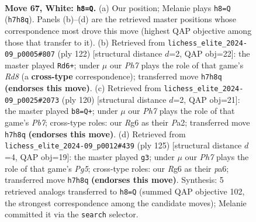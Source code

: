 \documentclass[11pt]{article}
\begin{document}
\clearpage

\begin{figure}[p]\centering
\begin{subfigure}{0.46\textwidth}\centering
\resizebox{\linewidth}{!}{%
\newchessgame
\chessboard[
  setfen={8/7P/6R1/8/8/8/3k1K2/4N3 w - - 1 67},
  showmover=false,
  pgfstyle=straightmove, color=movearrow, markmove={h7-h8}
]}
\caption{}
\end{subfigure}\hfill
\begin{subfigure}{0.46\textwidth}\centering
\resizebox{\linewidth}{!}{%
\newchessgame
\chessboard[
  setfen={3R4/8/5k2/6N1/5K2/8/8/1r6 w - - 27 62},
  showmover=false,
  pgfstyle=straightmove, color=movearrow, markmove={d8-d6}
]}
\caption{}
\end{subfigure}
\\[4pt]
\begin{subfigure}{0.46\textwidth}\centering
\resizebox{\linewidth}{!}{%
\newchessgame
\chessboard[
  setfen={8/1P6/8/8/5k2/5N2/P5K1/8 w - - 1 61},
  showmover=false,
  pgfstyle=straightmove, color=movearrow, markmove={b7-b8}
]}
\caption{}
\end{subfigure}\hfill
\begin{subfigure}{0.46\textwidth}\centering
\resizebox{\linewidth}{!}{%
\newchessgame
\chessboard[
  setfen={8/8/P7/8/4n1p1/4K3/8/5k2 b - - 0 63},
  showmover=false,
  pgfstyle=straightmove, color=movearrow, markmove={g4-g3}
]}
\caption{}
\end{subfigure}
\caption{\textbf{Move 67, White: \texttt{h8=Q}.} (a) Our position; Melanie plays \texttt{h8=Q} (\texttt{h7h8q}). Panels (b)--(d) are the retrieved master positions whose correspondence most drove this move (highest QAP objective among those that transfer to it). (b) Retrieved from \texttt{lichess\_elite\_2024-09\_p0005\#807} (ply 122) [structural distance $d$=2, QAP obj=22]: the master played \texttt{Rd6+}; under $\mu$ our \emph{Ph7} plays the role of that game's \emph{Rd8} (a \textbf{cross-type} correspondence); transferred move \texttt{h7h8q} \textbf{(endorses this move)}. (c) Retrieved from \texttt{lichess\_elite\_2024-09\_p0025\#2073} (ply 120) [structural distance $d$=2, QAP obj=21]: the master played \texttt{b8=Q+}; under $\mu$ our \emph{Ph7} plays the role of that game's \emph{Pb7}; cross-type roles: our \emph{R}g6 as their \emph{P}a2; transferred move \texttt{h7h8q} \textbf{(endorses this move)}. (d) Retrieved from \texttt{lichess\_elite\_2024-09\_p0012\#439} (ply 125) [structural distance $d$=4, QAP obj=19]: the master played \texttt{g3}; under $\mu$ our \emph{Ph7} plays the role of that game's \emph{Pg5}; cross-type roles: our \emph{R}g6 as their \emph{p}a6; transferred move \texttt{h7h8q} \textbf{(endorses this move)}. Synthesis: 5 retrieved analogs transferred to \texttt{h8=Q} (summed QAP objective 102, the strongest correspondence among the candidate moves); Melanie committed it via the \texttt{search} selector.}
\label{fig:thought-m132}
\end{figure}
\end{document}
